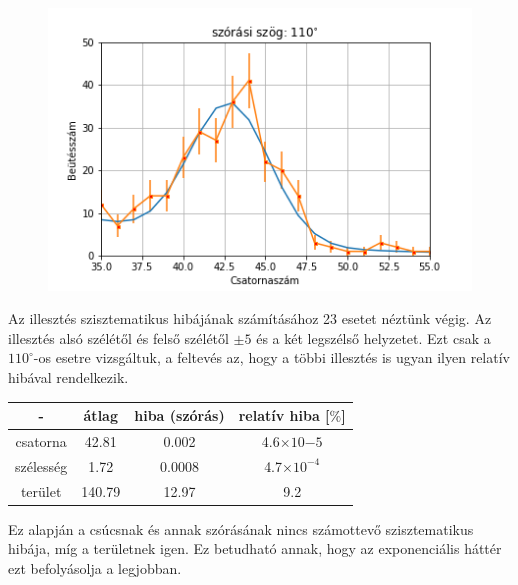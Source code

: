 \documentclass[a4paper,12pt]{article}
\begin{document}
\begin{figure}[!htb]
\begin{minipage}{.49\textwidth}
    \end{minipage}
    \begin{minipage}{.49\textwidth}
        \centering
        \includegraphics[width=1.\linewidth]{../plots/withbackground/110_1098fit.png}
    \end{minipage}
\end{figure}

\newpage

\par Az illesztés szisztematikus hibájának számításához 23 esetet néztünk végig. Az illesztés alsó szélétől és felső szélétől $\pm 5$ és a két legszélső helyzetet. Ezt csak a $110^{\circ}$-os esetre vizsgáltuk, a feltevés az, hogy a többi illesztés is ugyan ilyen relatív hibával rendelkezik.

\begin{center}
\begin{tabular}{|c|c|c|c|}
\hline
- & átlag & hiba (szórás) & relatív hiba [$\%$] \\
\hline
csatorna & 42.81 & 0.002 & 4.6$\times 10{-5}$ \\
\hline
szélesség & 1.72 & 0.0008 & 4.7$\times 10^{-4}$ \\
\hline
terület & 140.79 & 12.97 & 9.2 \\
\hline

\end{tabular}
\end{center}

\par Ez alapján a csúcsnak és annak szórásának nincs számottevő szisztematikus hibája, míg a területnek igen. Ez betudható annak, hogy az exponenciális háttér ezt befolyásolja a legjobban.
\end{document}
